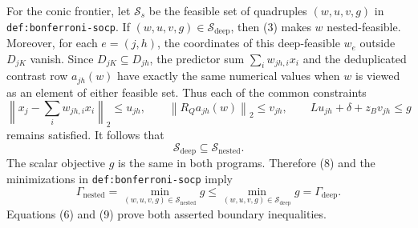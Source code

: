 For the conic frontier, let \(\mathcal S_s\) be the feasible set of quadruples \((w,u,v,g)\) in \texttt{def:bonferroni-socp}.  If \((w,u,v,g)\in\mathcal S_{\mathrm{deep}}\), then (3) makes \(w\) nested-feasible.  Moreover, for each \(e=(j,h)\), the coordinates of this deep-feasible \(w_e\) outside \(D_{jK}\) vanish.  Since \(D_{jK}\subseteq D_{jh}\), the predictor sum \(\sum_iw_{jh,i}x_i\) and the deduplicated contrast row \(a_{jh}(w)\) have exactly the same numerical values when \(w\) is viewed as an element of either feasible set.  Thus each of the common constraints
\[
 \left\|x_j-\sum_iw_{jh,i}x_i\right\|_2\leq u_{jh},
 \qquad
 \left\|R_Qa_{jh}(w)\right\|_2\leq v_{jh},
 \qquad
 Lu_{jh}+\delta+z_Bv_{jh}\leq g \tag{7}
\]
remains satisfied.  It follows that
\[
 \mathcal S_{\mathrm{deep}}\subseteq\mathcal S_{\mathrm{nested}}. \tag{8}
\]
The scalar objective \(g\) is the same in both programs.  Therefore (8) and the minimizations in \texttt{def:bonferroni-socp} imply
\[
 \Gamma_{\mathrm{nested}}
 =\min_{(w,u,v,g)\in\mathcal S_{\mathrm{nested}}}g
 \leq
 \min_{(w,u,v,g)\in\mathcal S_{\mathrm{deep}}}g
 =\Gamma_{\mathrm{deep}}. \tag{9}
\]
Equations (6) and (9) prove both asserted boundary inequalities.
